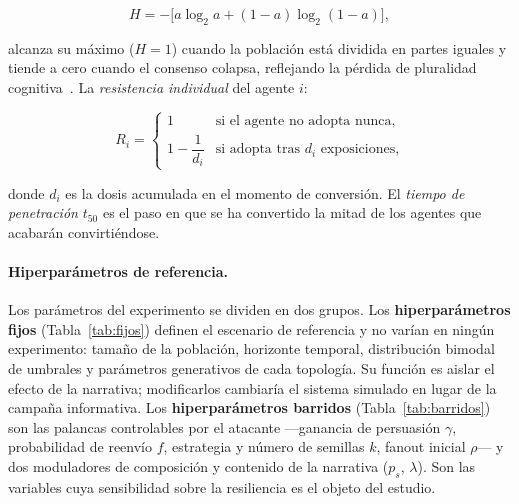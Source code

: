 \begin{equation}
  \label{eq:entropia}
  H = -\bigl[a \log_2 a + (1 - a) \log_2 (1 - a)\bigr],
\end{equation}

\noindent alcanza su máximo ($H = 1$) cuando la población está dividida en partes iguales y tiende a cero cuando el consenso colapsa, reflejando la pérdida de pluralidad cognitiva~\cite{PolytechniqueCNA2026}. La \emph{resistencia individual} del agente $i$:

\begin{equation}
  \label{eq:Ri}
  R_i =
  \begin{cases}
    1 & \text{si el agente no adopta nunca,}\\[4pt]
    1 - \dfrac{1}{d_i} & \text{si adopta tras } d_i \text{ exposiciones,}
  \end{cases}
\end{equation}

\noindent donde $d_i$ es la dosis acumulada en el momento de conversión. El \emph{tiempo de penetración} $t_{50}$ es el paso en que se ha convertido la mitad de los agentes que acabarán convirtiéndose.

\paragraph{Hiperparámetros de referencia.}
Los parámetros del experimento se dividen en dos grupos. Los \textbf{hiperparámetros fijos} (Tabla~\ref{tab:fijos}) definen el escenario de referencia y no varían en ningún experimento: tamaño de la población, horizonte temporal, distribución bimodal de umbrales y parámetros generativos de cada topología. Su función es aislar el efecto de la narrativa; modificarlos cambiaría el sistema simulado en lugar de la campaña informativa. Los \textbf{hiperparámetros barridos} (Tabla~\ref{tab:barridos}) son las palancas controlables por el atacante ---ganancia de persuasión $\gamma$, probabilidad de reenvío $f$, estrategia y número de semillas $k$, fanout inicial $\rho$--- y dos moduladores de composición y contenido de la narrativa ($p_s$, $\lambda$). Son las variables cuya sensibilidad sobre la resiliencia es el objeto del estudio.

